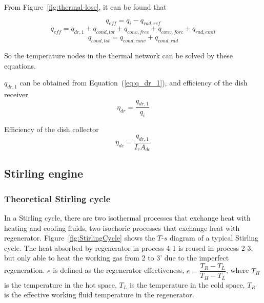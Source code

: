 From Figure~\ref{fig:thermal-lose}, it can be found that

\begin{equation}
  q_{eff} = q_i - q_{rad,ref}
\end{equation}
\begin{equation}
  q_{eff} = q_{dr,1} + q_{cond,tot} + q_{conv,free} + q_{conv,forc}+q_{rad,emit}
\end{equation}
\begin{equation}
  q_{cond,tot} = q_{cond,conv}+q_{cond,rad}
\end{equation}

So the temperature nodes in the thermal network can be solved by these equations.

$q_{dr,1}$ can be obtained from Equation~(\ref{eq:q_dr_1}), and efficiency of the dish receiver
\begin{equation}
  \eta_{dr} = \frac{q_{dr,1}}{q_i}
\end{equation}

Efficiency of the dish collector
\begin{equation}
  \eta_{dc} = \frac{q_{dr,1}}{I_rA_{dc}}
\end{equation}

\subsection{Stirling engine}\label{sec:StirlingEngineModel}
\subsubsection{Theoretical Stirling cycle}
In a Stirling cycle, there are two isothermal processes that exchange heat with heating and cooling fluids, two isochoric processes that exchange heat with regenerator. Figure~\ref{fig:StirlingCycle} shows the $T$-$s$ diagram of a typical Stirling cycle. The heat absorbed by regenerator in process 4-1 is reused in process 2-3, but only able to heat the working gas from 2 to 3' due to the imperfect regeneration. $e$ is defined as the regenerator effectiveness\cite{Formosa2010,Juhasz2010}, $e=\dfrac{T_R-T_L}{T_H-T_L}$, where $T_H$ is the temperature in the hot space, $T_L$ is the temperature in the cold space, $T_R$ is the effective working fluid temperature in the regenerator.

